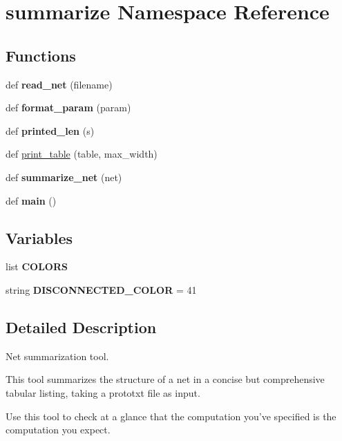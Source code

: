\hypertarget{namespacesummarize}{}\section{summarize Namespace Reference}
\label{namespacesummarize}
\subsection*{Functions}
\begin{DoxyCompactItemize}
\item 
\mbox{\label{namespacesummarize_a7bd4a84cdbad8884ad92a7806ae1422a}} 
def {\bfseries read\+\_\+net} (filename)
\item 
\mbox{\label{namespacesummarize_a6f8438960969506f79fa91c85d889c4e}} 
def {\bfseries format\+\_\+param} (param)
\item 
\mbox{\label{namespacesummarize_a3416c5ed12285b7cb8b442b25f7ad649}} 
def {\bfseries printed\+\_\+len} (s)
\item 
def \mbox{\hyperlink{namespacesummarize_aed3c88b7cc0075038238f0a5d153cd65}{print\+\_\+table}} (table, max\+\_\+width)
\item 
\mbox{\label{namespacesummarize_a135dc4de9b7d18e58bca4357664ff403}} 
def {\bfseries summarize\+\_\+net} (net)
\item 
\mbox{\label{namespacesummarize_a3828636c21757fdc63ccc87b52a78427}} 
def {\bfseries main} ()
\end{DoxyCompactItemize}
\subsection*{Variables}
\begin{DoxyCompactItemize}
\item 
list {\bfseries C\+O\+L\+O\+RS}
\item 
\mbox{\label{namespacesummarize_a975fa6c4a1b9d23b8aa63ef584be23c9}} 
string {\bfseries D\+I\+S\+C\+O\+N\+N\+E\+C\+T\+E\+D\+\_\+\+C\+O\+L\+OR} = \textquotesingle{}41\textquotesingle{}
\end{DoxyCompactItemize}


\subsection{Detailed Description}
\begin{DoxyVerb}Net summarization tool.

This tool summarizes the structure of a net in a concise but comprehensive
tabular listing, taking a prototxt file as input.

Use this tool to check at a glance that the computation you've specified is the
computation you expect.
\end{DoxyVerb}
 

